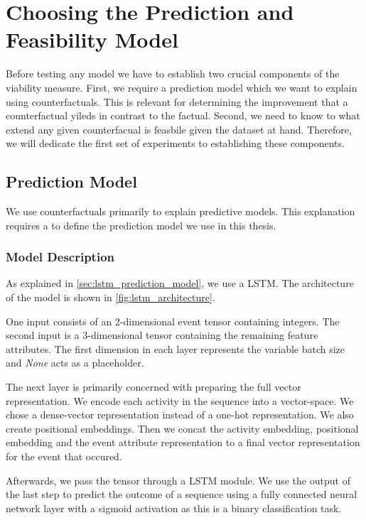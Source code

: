 \documentclass[./../../paper.tex]{subfiles}
\begin{document}
\section{Choosing the Prediction and Feasibility Model}
Before testing any model we have to establish two crucial components of the viability measure. First, we require a prediction model which we want to explain using counterfactuals. This is relevant for determining the improvement that a counterfactual yileds in contrast to the factual. Second, we need to know to what extend any given counterfacual is feasbile given the dataset at hand. Therefore, we will dedicate the first set of experiments to establishing these components.

\subsection{Prediction Model}
We use counterfactuals primarily to explain predictive models. This explanation requires a to define the prediction model we use in this thesis.

\subsubsection{Model Description}
As explained in \autoref{sec:lstm_prediction_model}, we use a \gls{LSTM}.
The architecture of the model is shown in \autoref{fig:lstm_architecture}.

One input consists of an 2-dimensional event tensor containing integers. The second input is a 3-dimensional tensor containing the remaining feature attributes. The first dimension in each layer represents the variable batch size and \emph{None} acts as a placeholder.

The next layer is primarily concerned with preparing the full vector representation. We encode each activity in the sequence into a vector-space. We chose a dense-vector representation instead of a one-hot representation. We also create positional embeddings. Then we concat the activity embedding, positional embedding and the event attribute representation to a final vector representation for the event that occured.

Afterwards, we pass the tensor through a \gls{LSTM} module. We use the output of the last step to predict the outcome of a sequence using a fully connected neural network layer with a sigmoid activation as this is a binary classification task.
\end{document}
